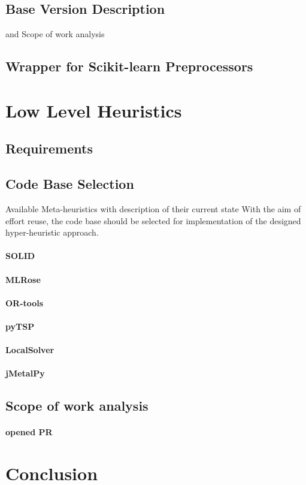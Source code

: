 \subsection{Base Version Description} and Scope of work analysis
\subsection{Wrapper for Scikit-learn Preprocessors}


\section{Low Level Heuristics}\label{Impl: LLH}

\subsection{Requirements}

\subsection{Code Base Selection}\label{implementation:llh code basis selection}
Available Meta-heuristics with description of their current state
With the aim of effort reuse, the code base should be selected for implementation of the designed hyper-heuristic approach.
\paragraph{SOLID}
\paragraph{MLRose}
\paragraph{OR-tools}
\paragraph{pyTSP}
\paragraph{LocalSolver}
\paragraph{jMetalPy}

\subsection{Scope of work analysis}
\paragraph{opened PR}

\section{Conclusion}

